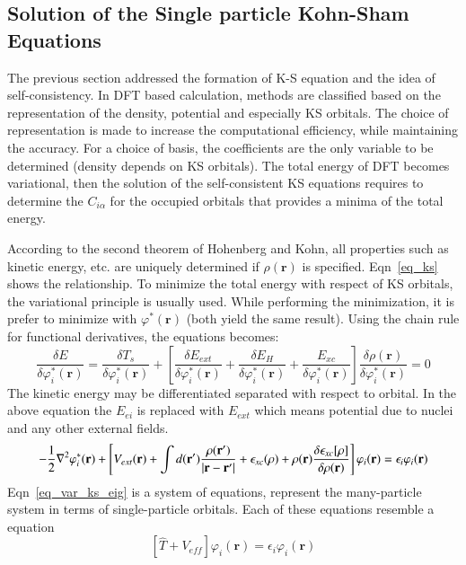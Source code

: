 \subsection{Solution of the Single particle Kohn-Sham Equations}
The previous section addressed the formation of K-S equation and the idea of self-consistency. In DFT based calculation, methods are classified based on the representation of the density, potential and especially KS orbitals. The choice of representation is made to increase the computational efficiency, while maintaining the accuracy.
For a choice of basis, the coefficients are the only variable to be determined (density depends on KS orbitals). The total energy of DFT becomes variational, then the solution of the self-consistent KS equations requires to determine the $C_{i\alpha}$ for the occupied orbitals that provides a minima of the total energy.

According to the second theorem of Hohenberg and Kohn, all properties such as kinetic energy, etc. are uniquely determined if $\rho(\mathbf{r})$ is specified. Eqn~\ref{eq_ks} shows the relationship. To minimize the total energy with respect of KS orbitals, the variational principle is usually used. While performing the minimization, it is prefer to minimize with $\varphi^{\ast}(\mathbf{r})$ (both yield the same result). Using the chain rule for functional derivatives, the equations becomes:
\begin{equation}
\label{eq_var_ks}
\frac{\delta E}{\delta \varphi^{\ast}_i(\mathbf{r})} = \frac{\delta T_s}{\delta \varphi^{\ast}_i(\mathbf{r})} + \left [ \frac{\delta E_{ext}}{\delta \varphi^{\ast}_i(\mathbf{r})} + \frac{\delta E_H}{\delta \varphi^{\ast}_i(\mathbf{r})} + \frac{E_{xc}}{\delta \varphi^{\ast}_i(\mathbf{r})}	\right ] \frac{\delta \rho(\mathbf{r})}{\delta \varphi^{\ast}_i(\mathbf{r})}  = 0
\end{equation}
The kinetic energy may be differentiated separated with respect to orbital. In the above equation the $E_{ei}$ is replaced with $E_{ext}$ which means potential due to nuclei and any other external fields.
\begin{equation}
\label{eq_var_ks_eig}
-\frac{1}{2} \nabla^2 \varphi^{\ast}_i (\mathbf{r}) + \left [ V_{ext} (\mathbf{r}) + \int d(\mathbf{r'}) \frac{\rho(\mathbf{r'})}{\abs{\mathbf{r}-\mathbf{r'}}} + \epsilon_{xc} (\rho) + \rho(\mathbf{r}) \frac{\delta \epsilon_{xc}[\rho]}{\delta \rho(\mathbf{r})}   \right ] \varphi_i(\mathbf{r})  = \epsilon_i \varphi_i (\mathbf{r})
\end{equation}
Eqn~\ref{eq_var_ks_eig} is a system of equations, represent the many-particle system in terms of single-particle orbitals. Each of these equations resemble a \schrod equation
\begin{equation}
\label{eq_ks_s}
\left [ \hat{T} + V_{eff}\right ] \varphi_i (\mathbf{r}) = \epsilon_i \varphi_i (\mathbf{r})
\end{equation}

